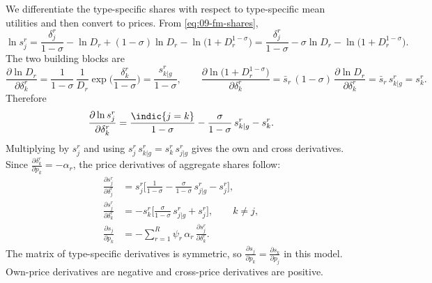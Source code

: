 We differentiate the type-specific shares with respect to type-specific mean utilities and then convert
to prices. From \eqref{eq:09-fm-shares},
\begin{equation*}
\ln s^r_j=\frac{\delta^r_j}{1-\sigma}-\ln D_r+(1-\sigma)\ln D_r-\ln\big(1+D_r^{1-\sigma}\big)
=\frac{\delta^r_j}{1-\sigma}-\sigma\ln D_r-\ln\big(1+D_r^{1-\sigma}\big).
\end{equation*}
The two building blocks are
\begin{equation*}
\frac{\partial\ln D_r}{\partial\delta^r_k}=\frac{1}{1-\sigma}\,\frac{1}{D_r}\exp\Big(\frac{\delta^r_k}{1-\sigma}\Big)
=\frac{s^r_{k|g}}{1-\sigma},
\qquad
\frac{\partial\ln\big(1+D_r^{1-\sigma}\big)}{\partial\delta^r_k}
=\bar s_r\,(1-\sigma)\,\frac{\partial\ln D_r}{\partial\delta^r_k}=\bar s_r\,s^r_{k|g}=s^r_k .
\end{equation*}
Therefore
\begin{equation*}
\frac{\partial\ln s^r_j}{\partial\delta^r_k}
=\frac{\indic\{j=k\}}{1-\sigma}-\frac{\sigma}{1-\sigma}\,s^r_{k|g}-s^r_k .
\end{equation*}
Multiplying by $s^r_j$ and using $s^r_j\,s^r_{k|g}=s^r_k\,s^r_{j|g}$ gives the own and cross derivatives.
Since $\frac{\partial\delta^r_k}{\partial p_k}=-\alpha_r$, the price derivatives of aggregate shares
follow:
\begin{subequations}\label{eq:09-fm-derivs}
\begin{align}
\frac{\partial s^r_j}{\partial\delta^r_j}&=s^r_j\Big[\frac{1}{1-\sigma}-\frac{\sigma}{1-\sigma}\,s^r_{j|g}-s^r_j\Big],\\
\frac{\partial s^r_j}{\partial\delta^r_k}&=-s^r_k\Big[\frac{\sigma}{1-\sigma}\,s^r_{j|g}+s^r_j\Big],\qquad k\neq j,\\
\frac{\partial s_j}{\partial p_k}&=-\sum_{r=1}^R\psi_r\,\alpha_r\,\frac{\partial s^r_j}{\partial\delta^r_k}.
\end{align}
\end{subequations}
The matrix of type-specific derivatives is symmetric, so $\frac{\partial s_j}{\partial p_k}=\frac{\partial
s_k}{\partial p_j}$ in this model. Own-price derivatives are negative and cross-price derivatives are
positive.


